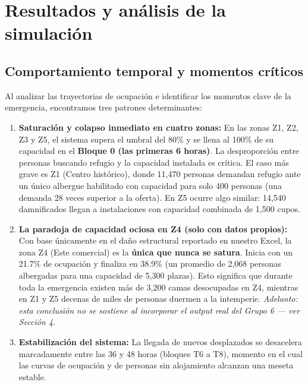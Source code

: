 \documentclass[10pt,letterpaper]{article}
\begin{document}
\section{Resultados y análisis de la simulación}

\subsection{Comportamiento temporal y momentos críticos}
Al analizar las trayectorias de ocupación e identificar los momentos clave de la emergencia, encontramos tres patrones determinantes:

\begin{enumerate}
    \item \textbf{Saturación y colapso inmediato en cuatro zonas:} En las zonas Z1, Z2, Z3 y Z5, el sistema supera el umbral del 80\% y se llena al 100\% de su capacidad en el \textbf{Bloque 0 (las primeras 6 horas)}. La desproporción entre personas buscando refugio y la capacidad instalada es crítica. El caso más grave es Z1 (Centro histórico), donde 11,470 personas demandan refugio ante un único albergue habilitado con capacidad para solo 400 personas (una demanda 28 veces superior a la oferta). En Z5 ocurre algo similar: 14,540 damnificados llegan a instalaciones con capacidad combinada de 1,500 cupos.
    \item \textbf{La paradoja de capacidad ociosa en Z4 (solo con datos propios):} Con base únicamente en el daño estructural reportado en nuestro Excel, la zona Z4 (Este comercial) es la \textbf{única que nunca se satura}. Inicia con un 21.7\% de ocupación y finaliza en 38.9\% (un promedio de 2,068 personas albergadas para una capacidad de 5,300 plazas). Esto significa que durante toda la emergencia existen más de 3,200 camas desocupadas en Z4, mientras en Z1 y Z5 decenas de miles de personas duermen a la intemperie. \textit{Adelanto: esta conclusión no se sostiene al incorporar el output real del Grupo 6 --- ver Sección 4.}
    \item \textbf{Estabilización del sistema:} La llegada de nuevos desplazados se desacelera marcadamente entre las 36 y 48 horas (bloques T6 a T8), momento en el cual las curvas de ocupación y de personas sin alojamiento alcanzan una meseta estable.
\end{enumerate}
\end{document}
